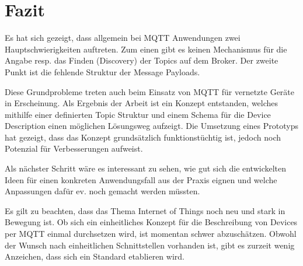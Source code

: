 \chapter{Fazit}
\label{chap:schlussfolgerungen}

Es hat sich gezeigt, dass allgemein bei MQTT Anwendungen zwei Hauptschwierigkeiten auftreten. Zum einen gibt es keinen Mechanismus für die Angabe resp. das Finden (Discovery) der Topics auf dem Broker. Der zweite Punkt ist die fehlende Struktur der Message Payloads. 

Diese Grundprobleme treten auch beim Einsatz von MQTT für vernetzte Geräte in Erscheinung. Als Ergebnis der Arbeit ist ein Konzept entstanden, welches mithilfe einer definierten Topic Struktur und einem Schema für die Device Description einen möglichen Lösungsweg aufzeigt. Die Umsetzung eines Prototyps hat gezeigt, dass das Konzept grundsätzlich funktionstüchtig ist, jedoch noch Potenzial für Verbesserungen aufweist.

Als nächster Schritt wäre es interessant zu sehen, wie gut sich die entwickelten Ideen für einen konkreten Anwendungsfall aus der Praxis eignen und welche Anpassungen dafür ev. noch gemacht werden müssten.


Es gilt zu beachten, dass das Thema Internet of Things noch neu und stark in Bewegung ist. Ob sich ein einheitliches Konzept für die Beschreibung von Devices per MQTT einmal durchsetzen wird, ist momentan schwer abzuschätzen. Obwohl der Wunsch nach einheitlichen Schnittstellen vorhanden ist, gibt  es zurzeit wenig Anzeichen, dass sich ein Standard etablieren wird.